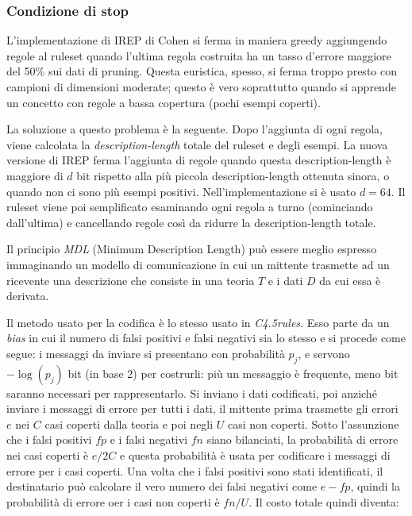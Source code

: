 \subsubsection*{Condizione di stop}
L'implementazione di IREP di Cohen si ferma in maniera greedy aggiungendo regole al ruleset quando l'ultima regola costruita ha un tasso d'errore maggiore del 50\% sui dati di pruning. Questa euristica, spesso, si ferma troppo presto con campioni di dimensioni moderate; questo è vero soprattutto quando si apprende un concetto con regole a bassa copertura (pochi esempi coperti).

La soluzione a questo problema è la seguente. Dopo l'aggiunta di ogni regola, viene calcolata la \textit{description-length} totale del ruleset e degli esempi. La nuova versione di IREP ferma l'aggiunta di regole quando questa description-length è maggiore di $d$ bit rispetto alla più piccola description-length ottenuta sinora, o quando non ci sono più esempi positivi. Nell'implementazione si è usato $d = 64$. Il ruleset viene poi semplificato esaminando ogni regola a turno (cominciando dall'ultima) e cancellando regole così da ridurre la description-length totale.

Il principio \emph{MDL} (Minimum Description Length) può essere meglio espresso immaginando un modello di comunicazione in cui un mittente trasmette ad un ricevente una descrizione che consiste in una teoria $T$ e i dati $D$ da cui essa è derivata\cite{Quinlan:1989:IDT:70758.70761}.

Il metodo usato per la codifica è lo stesso usato in \emph{C4.5rules}\cite{Quinlan95mdland}. Esso parte da un \emph{bias} in cui il numero di falsi positivi e falsi negativi sia lo stesso e si procede come segue: i messaggi da inviare si presentano con probabilità $p_j$, e servono $-\log(p_j)$ bit (in base 2) per costrurli: più un messaggio è frequente, meno bit saranno necessari per rappresentarlo. Si inviano i dati codificati, poi anziché inviare i messaggi di errore per tutti i dati, il mittente prima trasmette gli errori $e$ nei $C$ casi coperti dalla teoria e poi negli $U$ casi non coperti. Sotto l'assunzione che i falsi positivi $fp$ e i falsi negativi $fn$ siano bilanciati, la probabilità di errore nei casi coperti è $e/2C$ e questa probabilità è usata per codificare i messaggi di errore per i casi coperti. Una volta che i falsi positivi sono stati identificati, il destinatario può calcolare il vero numero dei falsi negativi come $e-fp$, quindi la probabilità di errore oer i casi non coperti è $fn/U$. Il costo totale quindi diventa:

